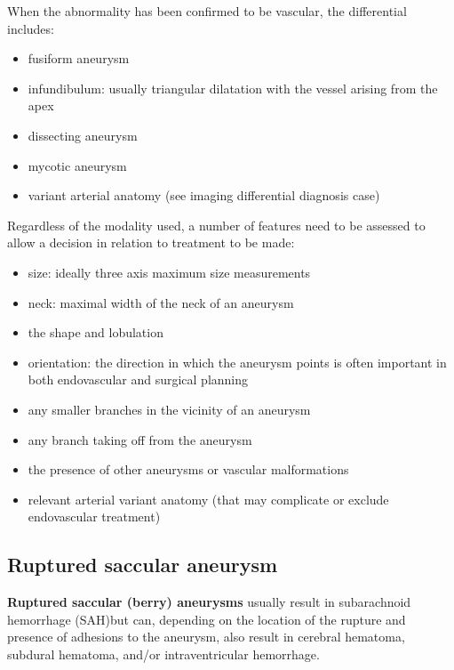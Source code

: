 \begin{tcolorbox}[colback=green!5!white,colframe=green!75!white,title=Differential diagnosis]
	When the abnormality has been confirmed to be vascular, the differential includes:
	
	\begin{itemize}
		\item
		fusiform aneurysm
		\item
		infundibulum: usually triangular dilatation with the vessel arising from the apex
		\item
		dissecting aneurysm
		\item
		mycotic aneurysm
		\item
		variant arterial anatomy (see imaging differential diagnosis case)
	\end{itemize}
\end{tcolorbox}

\begin{tcolorbox}[colback=purple!5!white,colframe=purple!75!white,title=Practical points]
	Regardless of the modality used, a number of features need to be assessed to allow a decision in relation to treatment to be made:
	
	\begin{itemize}
		\item
		size: ideally three axis maximum size measurements
		\item
		neck: maximal width of the neck of an aneurysm
		\item
		the shape and lobulation
		\item
		orientation: the direction in which the aneurysm points is often important in both endovascular and surgical planning
		\item
		any smaller branches in the vicinity of an aneurysm
		\item
		any branch taking off from the aneurysm
		\item
		the presence of other aneurysms or vascular malformations
		\item
		relevant arterial variant anatomy (that may complicate or exclude endovascular treatment)
	\end{itemize}
\end{tcolorbox}

\subsection{Ruptured saccular aneurysm}

\textbf{Ruptured saccular (berry) aneurysms} usually result in subarachnoid hemorrhage (SAH)but can, depending on the location of the rupture and presence of adhesions to the aneurysm, also result in cerebral hematoma, subdural hematoma, and/or intraventricular hemorrhage.


